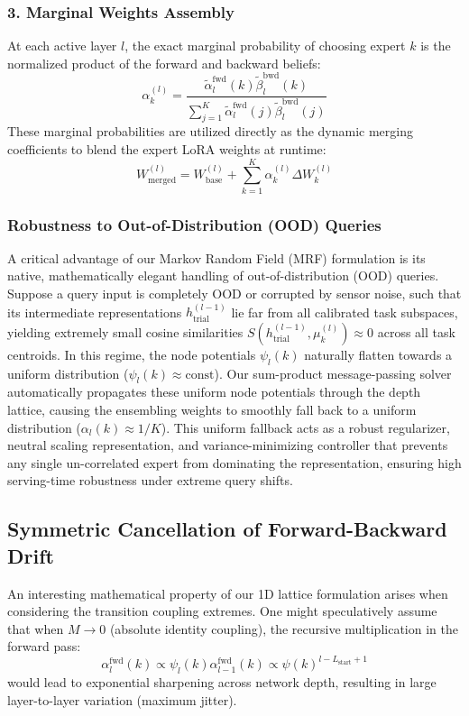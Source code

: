 \subsubsection{3. Marginal Weights Assembly}
At each active layer $l$, the exact marginal probability of choosing expert $k$ is the normalized product of the forward and backward beliefs:
\begin{equation}
    \alpha_k^{(l)} = \frac{\tilde{\alpha}^{\text{fwd}}_l(k) \tilde{\beta}^{\text{bwd}}_l(k)}{\sum_{j=1}^K \tilde{\alpha}^{\text{fwd}}_l(j) \tilde{\beta}^{\text{bwd}}_l(j)}
\end{equation}
These marginal probabilities are utilized directly as the dynamic merging coefficients to blend the expert LoRA weights at runtime:
\begin{equation}
    W^{(l)}_{\text{merged}} = W^{(l)}_{\text{base}} + \sum_{k=1}^K \alpha_k^{(l)} \Delta W_k^{(l)}
\end{equation}

\subsubsection{Robustness to Out-of-Distribution (OOD) Queries}
A critical advantage of our Markov Random Field (MRF) formulation is its native, mathematically elegant handling of out-of-distribution (OOD) queries. Suppose a query input is completely OOD or corrupted by sensor noise, such that its intermediate representations $h_{\text{trial}}^{(l-1)}$ lie far from all calibrated task subspaces, yielding extremely small cosine similarities $S(h_{\text{trial}}^{(l-1)}, \mu_k^{(l)}) \approx 0$ across all task centroids.
In this regime, the node potentials $\psi_l(k)$ naturally flatten towards a uniform distribution ($\psi_l(k) \approx \text{const}$).
Our sum-product message-passing solver automatically propagates these uniform node potentials through the depth lattice, causing the ensembling weights to smoothly fall back to a uniform distribution ($\alpha_l(k) \approx 1/K$). This uniform fallback acts as a robust regularizer, neutral scaling representation, and variance-minimizing controller that prevents any single un-correlated expert from dominating the representation, ensuring high serving-time robustness under extreme query shifts.

\subsection{Symmetric Cancellation of Forward-Backward Drift}
An interesting mathematical property of our 1D lattice formulation arises when considering the transition coupling extremes. One might speculatively assume that when $M \to 0$ (absolute identity coupling), the recursive multiplication in the forward pass:
\begin{equation}
    \alpha^{\text{fwd}}_l(k) \propto \psi_l(k) \alpha^{\text{fwd}}_{l-1}(k) \propto \psi(k)^{l - L_{\text{start}} + 1}
\end{equation}
would lead to exponential sharpening across network depth, resulting in large layer-to-layer variation (maximum jitter). 

